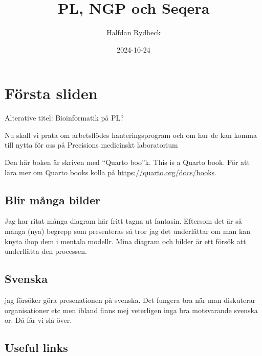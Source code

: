 \documentclass[
  letterpaper,
  DIV=11,
  numbers=noendperiod]{scrreprt}
\title{PL, NGP och Seqera}
\author{Halfdan Rydbeck}
\date{2024-10-24}
\renewcommand*\contentsname{Table of contents}
\newcommand\contentsname{Table of contents}
\begin{document}
\maketitle

\renewcommand*\contentsname{Table of contents}
{
\hypersetup{linkcolor=}
\setcounter{tocdepth}{2}
\tableofcontents
}

\chapter*{Första sliden}\label{fuxf6rsta-sliden}


Alterative titel: Bioinformatik på PL?

Nu skall vi prata om arbetsflödes hanteringsprogram och om hur de kan
komma till nytta för oss på Precisions medicinskt laboratorium

Den här boken är skriven med ``Quarto boo''k. This is a Quarto book. För
att lära mer om Quarto books kolla på
\url{https://quarto.org/docs/books}.

\section*{Blir många bilder}\label{blir-muxe5nga-bilder}


Jag har ritat många diagram här fritt tagna ut fantasin. Eftersom det är
så många (nya) begrepp som presenteras så tror jag det underlättar om
man kan knyta ihop dem i mentala modellr. Mina diagram och bilder är ett
försök att underllätta den processen.

\section*{Svenska}\label{svenska}


jag försöker göra presenationen på svenska. Det fungera bra när man
diskuterar organisationer etc men ibland finns mej veterligen inga bra
motsvarande svenska or. Då får vi slå över.

\section*{Useful links}\label{useful-links}
\end{document}
